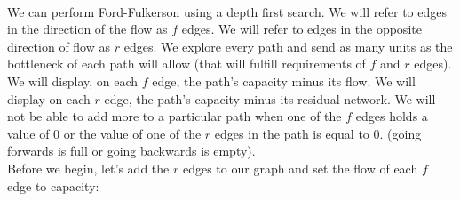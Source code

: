 \documentclass[11pt, solution, letterpaper]{format}
\begin{document}
\\

We can perform Ford-Fulkerson using a depth first search. We will refer to edges in the direction of the flow as $f$ edges. We will refer to edges in the opposite direction of flow as $r$ edges. We explore every path and send as many units as the bottleneck of each path will allow (that will fulfill requirements of $f$ and $r$ edges). We will display, on each $f$ edge, the path's capacity minus its flow. We will display on each $r$ edge, the path's capacity minus its residual network. We will not be able to add more to a particular path when one of the $f$ edges holds a value of 0 or the value of one of the $r$ edges in the path is equal to 0. (going forwards is full or going backwards is empty). \\

Before we begin, let's add the $r$ edges to our graph and set the flow of each $f$ edge to capacity:\\
\end{document}
